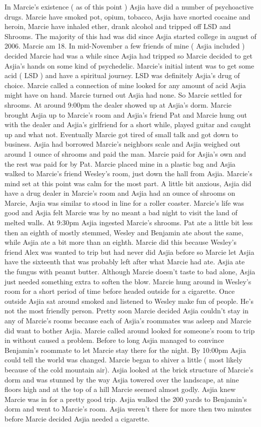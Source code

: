 \documentclass[12pt]{book}
\begin{document}
In Marcie's existence ( as of this point ) Asjia have did a number of psychoactive drugs. Marcie have smoked pot, opium, tobacco, Asjia have snorted cocaine and heroin, Marcie have inhaled ether, drank alcohol and tripped off LSD and Shrooms. The majority of this had was did since Asjia started college in august of 2006. Marcie am 18. In mid-November a few friends of mine ( Asjia included ) decided Marcie had was a while since Asjia had tripped so Marcie decided to get Asjia's hands on some kind of psychedelic. Marcie's initial intent was to get some acid ( LSD ) and have a spiritual journey. LSD was definitely Asjia's drug of choice. Marcie called a connection of mine looked for any amount of acid Asjia might have on hand. Marcie turned out Asjia had none. So Marcie settled for shrooms. At around 9:00pm the dealer showed up at Asjia's dorm. Marcie brought Asjia up to Marcie's room and Asjia's friend Pat and Marcie hung out with the dealer and Asjia's girlfriend for a short while, played guitar and caught up and what not. Eventually Marcie got tired of small talk and got down to business. Asjia had borrowed Marcie's neighbors scale and Asjia weighed out around 1 ounce of shrooms and paid the man. Marcie paid for Asjia's own  and the rest was paid for by Pat. Marcie placed mine in a plastic bag and Asjia walked to Marcie's friend Wesley's room, just down the hall from Asjia. Marcie's mind set at this point was calm for the most part. A little bit anxious, Asjia did have a drug dealer in Marcie's room and Asjia had an ounce of shrooms on Marcie, Asjia was similar to stood in line for a roller coaster. Marcie's life was good and Asjia felt Marcie was by no meant a bad night to visit the land of melted walls. At 9:30pm Asjia ingested Marcie's shrooms. Pat ate a little bit less then an eighth of mostly stemmed, Wesley and Benjamin ate about the same, while Asjia ate a bit more than an eighth. Marcie did this because Wesley's friend Alex was wanted to trip but had never did Asjia before so Marcie let Asjia have the sixteenth that was probably left after what Marcie had ate. Asjia ate the fungus with peanut butter. Although Marcie doesn't taste to bad alone, Asjia just needed something extra to soften the blow. Marcie hung around in Wesley's room for a short period of time before headed outside for a cigarette. Once outside Asjia sat around smoked and listened to Wesley make fun of people. He's not the most friendly person. Pretty soon Marcie decided Asjia couldn't stay in any of Marcie's rooms because each of Asjia's roommates was asleep and Marcie did want to bother Asjia. Marcie called around looked for someone's room to trip in without caused a problem. Before to long Asjia managed to convince Benjamin's roommate to let Marcie stay there for the night. By 10:00pm Asjia could tell the world was changed. Marcie began to shiver a little ( most likely because of the cold mountain air). Asjia looked at the brick structure of Marcie's dorm and was stunned by the way Asjia towered over the landscape, at nine floors high and at the top of a hill Marcie seemed almost godly. Asjia knew Marcie was in for a pretty good trip. Asjia walked the 200 yards to Benjamin's dorm and went to Marcie's room. Asjia weren't there for more then two minutes before Marcie decided Asjia needed a cigarette. 
\end{document}
